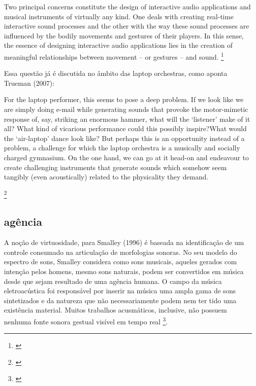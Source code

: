 \begin{citacao}
Two principal concerns constitute the design of interactive audio applications and musical instruments of virtually any kind. One deals with creating real-time interactive sound processes and the other with the way these sound processes are influenced by the bodily movements and gestures of their players. In this sense, the essence of designing interactive audio applications lies in the creation of meaningful relationships between movement – or gestures – and sound. \footnote{\cite{Schnell2013}}
\end{citacao}
Essa questão já é discutida no âmbito das laptop orchestras, como aponta Trueman (2007):
\begin{citacao}
For the laptop performer, this seems to pose a
deep problem. If we look like we are simply doing e-mail while generating sounds that provoke the motor-mimetic response of, say, striking an enormous hammer, what will the ‘listener’ make of it all? What kind of vicarious performance could this possibly inspire?What would the ‘air-laptop’ dance look like? 
But perhaps this is an opportunity instead of a problem, a challenge for which the laptop orchestra is a musically and socially charged gymnasium. On the one hand, we can go at it head-on and endeavour to create challenging instruments that generate sounds which somehow seem tangibly (even acoustically) related to the physicality they demand.





\footnote{\cite[6]{Trueman2007}}
\end{citacao}

\subsection{agência}


A noção de virtuosidade, para Smalley (1996) é baseada na identificação de um controle consumado na articulação de morfologias sonoras. No seu modelo do espectro de sons, Smalley considera como sons musicais, aqueles gerados com intenção pelos homens, mesmo sons naturais, podem ser convertidos em música desde que sejam resultado de uma agência humana. O campo da música eletroacústica foi responsável por inserir na música uma ampla gama de sons sintetizados e da natureza que não necessariamente podem nem ter tido uma existência material. Muitos trabalhos acusmáticos, inclusive, não possuem nenhuma fonte sonora gestual visível em tempo real \footnote{\cite[95, 101]{Smalley1996}}.



